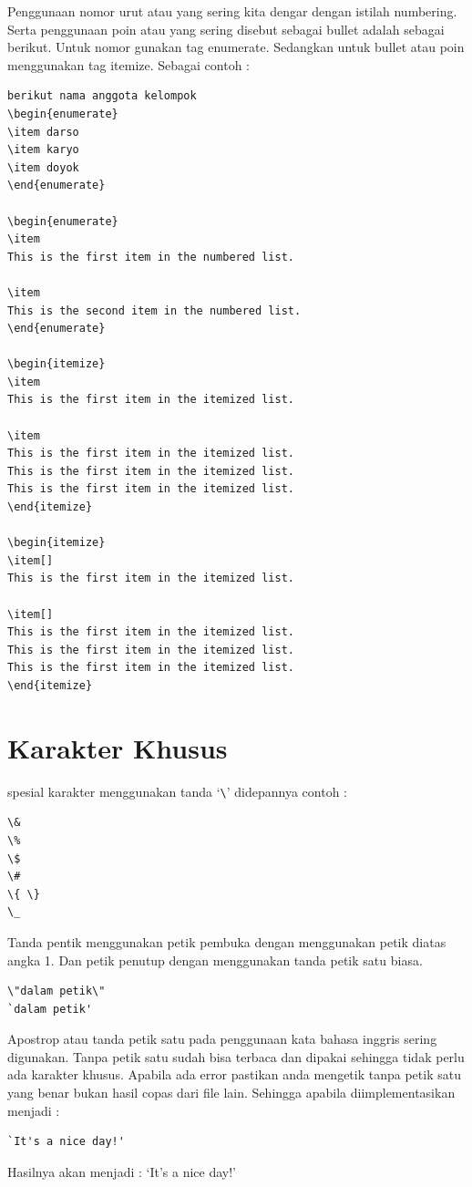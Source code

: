Penggunaan nomor urut atau yang sering kita dengar dengan istilah numbering. Serta penggunaan poin atau yang sering disebut sebagai bullet adalah sebagai berikut. Untuk nomor gunakan tag enumerate. Sedangkan untuk bullet atau poin menggunakan tag itemize. Sebagai contoh :
\begin{verbatim}
berikut nama anggota kelompok
\begin{enumerate}
\item darso
\item karyo
\item doyok
\end{enumerate}

\begin{enumerate}
\item
This is the first item in the numbered list.

\item
This is the second item in the numbered list.
\end{enumerate}

\begin{itemize}
\item
This is the first item in the itemized list.

\item
This is the first item in the itemized list.
This is the first item in the itemized list.
This is the first item in the itemized list.
\end{itemize}

\begin{itemize}
\item[]
This is the first item in the itemized list.

\item[]
This is the first item in the itemized list.
This is the first item in the itemized list.
This is the first item in the itemized list.
\end{itemize}
\end{verbatim}
    
\section{Karakter Khusus}

spesial karakter menggunakan tanda `\verb|\|' didepannya contoh :
\begin{verbatim}
\& 
\% 
\$ 
\#  
\{ \}
\_
\end{verbatim}

Tanda pentik menggunakan petik pembuka dengan menggunakan petik diatas angka 1. 
Dan petik penutup dengan menggunakan tanda petik satu biasa.
\begin{verbatim}
\"dalam petik\"
`dalam petik'
\end{verbatim} 
Apostrop atau tanda petik satu pada penggunaan kata bahasa inggris sering digunakan. Tanpa petik satu sudah bisa terbaca dan dipakai sehingga tidak perlu ada karakter khusus. Apabila ada error pastikan anda mengetik tanpa petik satu yang benar bukan hasil copas dari file lain. Sehingga apabila diimplementasikan menjadi :
\begin{verbatim}
`It's a nice day!'
\end{verbatim} 
Hasilnya akan menjadi : `It's a nice day!'

